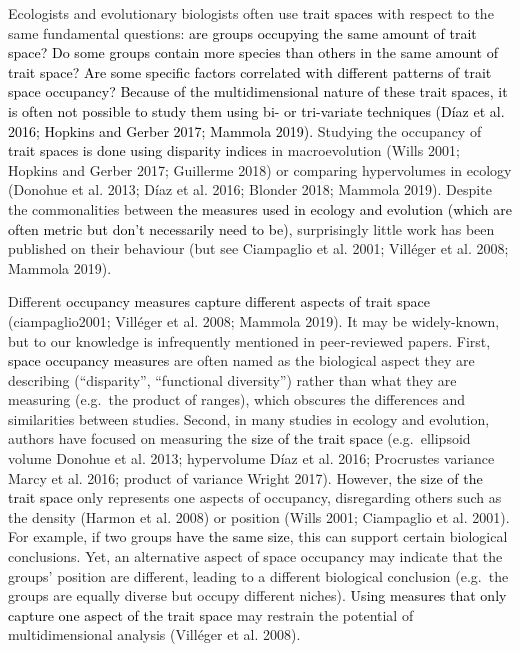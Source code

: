 \documentclass[]{article}
\begin{document}
\renewcommand\baselinestretch{1.6}\selectfont

Ecologists and evolutionary biologists often use
\textcolor{black}{trait spaces} with respect to the same
fundamental questions:
\textcolor{black}{are groups occupying the same amount of trait space?
Do some groups contain more species than others in the same amount of trait space?
Are some specific factors correlated with different patterns of trait space occupancy?
Because of the multidimensional nature of these trait spaces, it is often not possible to study them using bi- or tri-variate techniques (Díaz et al.
2016; Hopkins and Gerber 2017; Mammola 2019).}
Studying the occupancy of
\textcolor{black}{trait spaces is done using disparity indices}
in macroevolution (Wills 2001; Hopkins and Gerber 2017; Guillerme 2018)
or comparing hypervolumes in ecology (Donohue et al. 2013; Díaz et al.
2016; Blonder 2018; Mammola 2019). Despite the commonalities between
\textcolor{black}{the measures used in ecology and evolution (which are often metric but don't necessarily need to be)},
surprisingly little work has been published on their behaviour (but see
Ciampaglio et al. 2001; Villéger et al. 2008; Mammola 2019).

Different
\textcolor{black}{occupancy measures capture different aspects of  trait space}
(ciampaglio2001; Villéger et al. 2008; Mammola 2019). It may be
widely-known, but to our knowledge is infrequently mentioned in
peer-reviewed papers. First,
\textcolor{black}{space occupancy measures} are often named
as the biological aspect they are describing (``disparity'',
``functional diversity'') rather than what they are measuring (e.g.~the
product of ranges), which obscures the differences and similarities
between studies. Second, in many studies in ecology and evolution,
authors have focused on measuring the
\textcolor{black}{size of the trait space} (e.g.~ellipsoid
volume Donohue et al. 2013; hypervolume Díaz et al. 2016; Procrustes
variance Marcy et al. 2016; product of variance Wright 2017). However,
\textcolor{black}{the size of the trait space} only
represents one aspects of occupancy, disregarding others such as the
density (Harmon et al. 2008) or position (Wills 2001; Ciampaglio et al.
2001). For example, if two groups
\textcolor{black}{have the same size}, this can support
certain biological conclusions. Yet, an alternative aspect of space
occupancy may indicate that the groups' position are different, leading
to a different biological conclusion (e.g.~the groups are equally
diverse but occupy different niches).
\textcolor{black}{Using measures that only capture one aspect of the trait space}
may restrain the potential of multidimensional analysis (Villéger et al.
2008).
\end{document}
